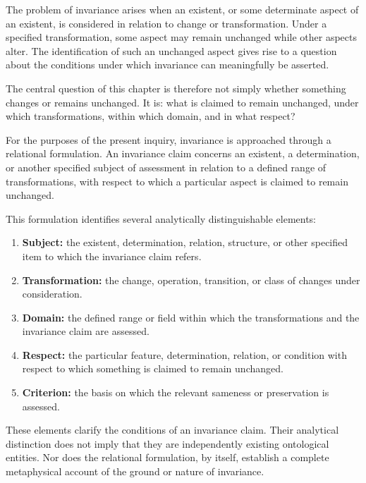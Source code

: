 The problem of invariance arises when an existent, or some
determinate aspect of an existent, is considered in relation
to change or transformation. Under a specified transformation,
some aspect may remain unchanged while other aspects alter.
The identification of such an unchanged aspect gives rise
to a question about the conditions under which invariance
can meaningfully be asserted.

The central question of this chapter is therefore not simply
whether something changes or remains unchanged. It is:
what is claimed to remain unchanged, under which transformations,
within which domain, and in what respect?

For the purposes of the present inquiry, invariance is
approached through a relational formulation. An invariance
claim concerns an existent, a determination, or another
specified subject of assessment in relation to a defined
range of transformations, with respect to which a particular
aspect is claimed to remain unchanged.

This formulation identifies several analytically distinguishable
elements:

\begin{enumerate}
    \item \textbf{Subject:} the existent, determination, relation,
    structure, or other specified item to which the invariance
    claim refers.

    \item \textbf{Transformation:} the change, operation, transition,
    or class of changes under consideration.

    \item \textbf{Domain:} the defined range or field within which
    the transformations and the invariance claim are assessed.

    \item \textbf{Respect:} the particular feature, determination,
    relation, or condition with respect to which something is
    claimed to remain unchanged.

    \item \textbf{Criterion:} the basis on which the relevant
    sameness or preservation is assessed.
\end{enumerate}

These elements clarify the conditions of an invariance claim.
Their analytical distinction does not imply that they are
independently existing ontological entities. Nor does the
relational formulation, by itself, establish a complete
metaphysical account of the ground or nature of invariance.

